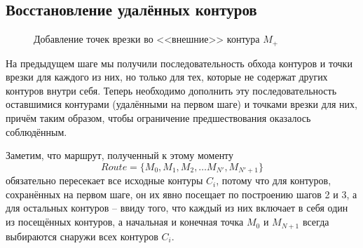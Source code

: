 \documentclass[14pt]{extarticle}
\theoremstyle{plain}%
\theoremstyle{remark}
\begin{document}
\subsection{Восстановление удалённых контуров}

\begin{figure}
  \centering
  \caption{Добавление точек врезки во <<внешние>> контура $M_+$}
  \label{extra-pierce-point}
\end{figure}

На предыдущем шаге мы получили
последовательность обхода контуров
и точки врезки для каждого из них,
но только для тех,
которые не содержат других контуров внутри себя.
Теперь необходимо дополнить эту последовательность
оставшимися контурами
(удалёнными на первом шаге)
и точками врезки для них,
причём таким образом,
чтобы ограничение предшествования
оказалось соблюдённым.

Заметим, что маршрут,
полученный к этому моменту
\begin{equation}
Route = \{ M_0, M_1, M_2, \dots M_{N'}, M_{N'+1}\}
\label{route0}
\end{equation}
обязательно пересекает все исходные контуры
$C_i$,
потому что для контуров,
сохранённых на первом шаге,
он их явно посещает
по построению шагов 2 и 3,
а для остальных контуров --
ввиду того, что
каждый из них включает в себя
один из посещённых контуров,
а начальная и конечная точка
$M_0$
и
$M_{N + 1}$
всегда выбираются снаружи всех контуров
$C_i$.
\end{document}
